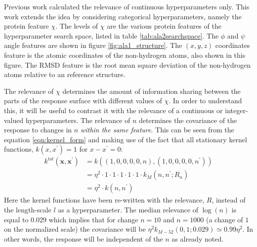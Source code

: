 Previous work \cite{bergstrajamesbergstraRandomSearchHyperParameter2012} calculated the relevance of continuous hyperparameters only.  This work extends the idea by considering categorical hyperparameters, namely the protein feature $\chi$. The levels of $\chi$ are the various protein features of the hyperparameter search space, listed in table \ref{tab:ala2searchspace}. The $\phi$ and $\psi$ angle features are shown in figure \ref{fig:ala1_structure}. The $(x, y, z)$ coordinates feature is the atomic coordinates of the non-hydrogen atoms, also shown in this figure.  The RMSD feature is the root mean square deviation of the non-hydrogen atoms relative to an reference structure.

The relevance of $\chi$ determines the amount of information sharing between the parts of the response surface with different values of $\chi$. In order to understand this, it will be useful to contrast it with  the relevance of a continuous or integer-valued hyperparameters.  The relevance of $n$ determines the covariance of the response to changes in $n$ \emph{within the same feature}. This can be seen from the equation \ref{eqn:kernel_form} and making use of the fact that all stationary kernel functions, $k(x, x^{\prime})=1$ for $x-x^{\prime}=0$:
\begin{equation*}
\begin{split}
    k^{tot}(\mathbf{x}, \mathbf{x}^{\prime})& = k\left((1, 0, 0, 0, 0, n), (1, 0, 0, 0, 0, n^{\prime})\right) \\
    & = \eta^{2}\cdot 1 \cdot 1\cdot 1 \cdot 1\cdot 1 \cdot k_{M}(n, n^{\prime}; R_{n}) \\
    & = \eta^{2}\cdot k(n, n^{\prime})
\end{split}
\end{equation*}
Here the kernel functions have been re-written with the relevance, $R$, instead of the length-scale $l$ as a hyperparameter. The median relevance of $\log{(n)}$ is equal to $\num{0.029}$ which implies that for change $n=10$ and $n=1000$ (a change of $1$ on the normalized scale) the covariance will be $\eta^{2}k_{M-52}(0,1; 0.029) \simeq 0.99\eta^{2}$. In other words, the response will be independent of the $n$ as already noted. 

